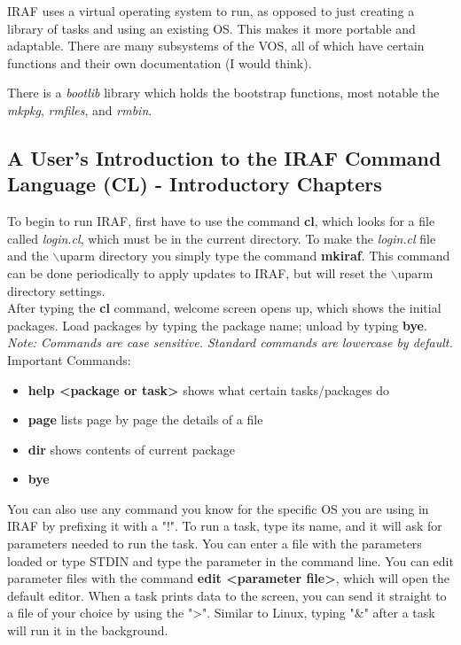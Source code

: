 \documentclass[a4paper]{article}
\begin{document}
IRAF uses a virtual operating system to run, as opposed to just creating a library of tasks and using an existing OS.  This makes it more portable and adaptable.  There are many subsystems of the VOS, all of which have certain functions and their own documentation (I would think). \par 
There is a \textit{bootlib} library which holds the bootstrap functions, most notable the \textit{mkpkg}, \textit{rmfiles}, and \textit{rmbin}.  

\subsection{A User's Introduction to the IRAF Command Language (CL) - Introductory Chapters}
To begin to run IRAF, first have to use the command \textbf{cl}, which looks for a file called \textit{login.cl}, which must be in the current directory.  To make the \textit{login.cl}  file and the $\backslash$uparm directory you simply type the command \textbf{mkiraf}.  This command can be done periodically to apply updates to IRAF, but will reset the $\backslash$uparm directory settings. \\
After typing the \textbf{cl} command, welcome screen opens up, which shows the initial packages.  Load packages by typing the package name; unload by typing \textbf{bye}.  \textit{Note: Commands are case sensitive.  Standard commands are lowercase by default.} \\
Important Commands:
\begin{itemize}
\item \textbf{help <package or task>} shows what certain tasks/packages do
\item \textbf{page} lists page by page the details of a file
\item \textbf{dir} shows contents of current package
\item \textbf{bye}
\end{itemize}
You can also use any command you know for the specific OS you are using in IRAF by prefixing it with a "!".  To run a task, type its name, and it will ask for parameters needed to run the task.  You can enter a file with the parameters loaded or type STDIN and type the parameter in the command line.  You can edit parameter files with the command \textbf{edit <parameter file>}, which will open the default editor. When a task prints data to the screen, you can send it straight to a file of your choice by using the ">".  Similar to Linux, typing "\&" after a task will run it in the background.\\
\end{document}
